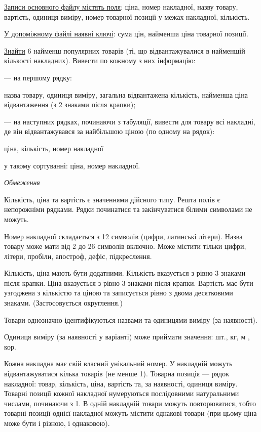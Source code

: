 \documentclass[11pt, ukrainian]{article}
\begin{document}
\underline{Записи основного файлу містять поля}: ціна, номер накладної, назву товару, вартість, одиниця виміру, номер товарної позиції у межах накладної, кількість.

\underline{У допоміжному файлі наявні ключі}: сума цін, найменша ціна товарної позиції.

\underline{Знайти} 6 найменш популярних товарів (ті, що відвантажувалися в найменшій кількості накладних). Вивести по кожному з них інформацію:\par
{\noindent}--- на першому рядку:\par
назва товару, одиниця виміру, загальна відвантажена кількість, найменша ціна відвантаження (з 2 знаками після крапки);

{\noindent}--- на наступних рядках, починаючи з табуляції, вивести для товару всі накладні, де він відвантажувався за найбільшою ціною (по одному на рядок):\par
ціна, кількість, номер накладної

{\noindent}у такому сортуванні: ціна, номер накладної.


\bigskip\textit{Обмеження}

Кількість, ціна та вартість є значеннями дійсного типу.
Решта полів є непорожніми рядками.
Рядки починатися та закінчуватися білими символами не можуть.

Номер накладної складається з 12 символів (цифри, латинські літери).
Назва товару може мати від 2 до 26 символів включно.
Може містити тільки цифри, літери, пробіли, апостроф, дефіс, підкреслення.

Кількість, ціна мають бути додатними.
Кількість вказується з рівно 3 знаками після крапки.
Ціна вказується з рівно 3 знаками після крапки.
Вартість має бути узгоджена з кількістю та ціною та записується рівно з двома десятковими знаками.
(Застосовується округлення.)

Товари однозначно ідентифікуються назвами та одиницями виміру (за наявності).

Одиниця виміру (за наявності у варіанті) може приймати значення: шт., кг, м , кор.

Кожна накладна має свій власний унікальний номер.
У накладній можуть відвантажуватися кілька товарів (не менше 1).
Товарна позиція --- рядок накладної: товар, кількість, ціна, вартість та, за наявності, одиниця виміру.
Товарні позиції кожної накладної нумеруються послідовними натуральними числами, починаючи з 1.
В одній накладній товари можуть повторюватися, 
тобто товарні позиції однієї накладної можуть містити однакові товари 
(при цьому ціна може бути і різною, і однаковою).
\end{document}
